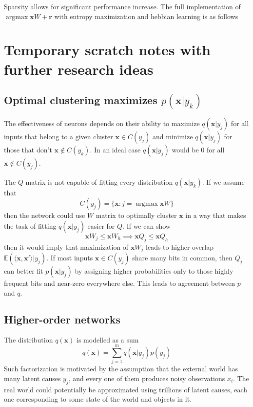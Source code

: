 \documentclass[oneside,english,logo]{amuthesis}
\DeclareMathOperator*{\argmax}{argmax}
\begin{document}
Sparsity allows for significant performance increase. The full implementation of  $\argmax \boldsymbol{x} W+\boldsymbol{r}$ with entropy maximization and hebbian learning is as follows



\fi

\section{Temporary scratch notes with further research ideas}

\subsection{Optimal clustering maximizes $p(\boldsymbol{x}|y_k)$} 
The effectiveness of neurons depends on their ability to maximize $q(\boldsymbol{x}|y_j)$ for all inputs that belong to a given cluster $\boldsymbol{x}\in C(y_j)$ and minimize $q(\boldsymbol{x}|y_j)$ for those that don't  $\boldsymbol{x}\notin C(y_k)$. In an ideal case $q(\boldsymbol{x}|y_j)$ would be $0$ for all $\boldsymbol{x}\notin C(y_j)$. 

The $Q$ matrix is not capable of fitting every distribution $q(\boldsymbol{x}|y_k)$.
If we assume that
\[
C(y_j) = \{\boldsymbol{x}:j=\argmax \boldsymbol{x}W\}
\]
then the network could use $W$ matrix to optimally cluster $\boldsymbol{x}$ in a way that makes the task of fitting $q(\boldsymbol{x}|y_j)$ easier for $Q$. If we can show
\[
\boldsymbol{x}W_j \le \boldsymbol{x}W_h  \implies  \boldsymbol{x}Q_j \le \boldsymbol{x}Q_h 
\]
then it would imply that maximization of $\boldsymbol{x}W_j$ leads to higher overlap
$\mathbb{E}(\langle \boldsymbol{x}, \boldsymbol{x}'\rangle|y_j) $. If most inputs $\boldsymbol{x}\in C(y_j)$ share many bits in common, then $Q_j$ can better fit $p(\boldsymbol{x}|y_j)$ by assigning higher probabilities only to those highly frequent bits and near-zero everywhere else. This leads to agreement between $p$ and $q$. 

\subsection{Higher-order networks}

The distribution $q(\boldsymbol{x})$ is modelled as a sum
\[
q(\boldsymbol{x}) = \sum_{j=1}^{m}q(\boldsymbol{x}|y_j)p(y_j) 
\]
Such factorization is motivated by the assumption that the external world has many latent causes $y_j$, and every one of them produces noisy observations $x_i$. The real world could potentially be approximated using trillions of latent causes, each one corresponding to some state of the world and objects in it. 
\end{document}
